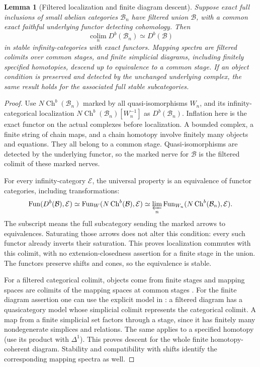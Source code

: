 \documentclass[11pt]{article}
\newtheorem{lemma}[theorem]{Lemma}
\theoremstyle{definition}
\theoremstyle{remark}
\begin{document}
\begin{lemma}[Filtered localization and finite diagram descent]
\label{lem:frag-filtered-enhanced-localization}
Suppose exact full inclusions of small abelian categories
$\mathcal B_n$ have filtered union $\mathcal B$, with a common exact
faithful underlying functor detecting cohomology.  Then
\[
 \operatorname*{colim}_nD^b(\mathcal B_n)\simeq D^b(\mathcal B)
\]
in stable infinity-categories with exact functors.  Mapping spectra
are filtered colimits over common stages, and finite simplicial
diagrams, including finitely specified homotopies, descend up to
equivalence to a common stage.  If an object condition is preserved
and detected by the unchanged underlying complex, the same result
holds for the associated full stable subcategories.
\end{lemma}
\begin{proof}
Use $N\operatorname{Ch}^b(\mathcal B_n)$ marked by all
quasi-isomorphisms $W_n$, and its infinity-categorical localization
$N\operatorname{Ch}^b(\mathcal B_n)[W_n^{-1}]$ as $D^b(\mathcal B_n)$.
Inflation here is the exact functor on the actual complexes before
localization.  A bounded complex, a finite string of chain maps,
and a chain homotopy involve finitely many objects and equations.
They all belong to a common stage.  Quasi-isomorphisms are detected
by the underlying functor, so the marked nerve for $\mathcal B$
is the filtered colimit of these marked nerves.

For every infinity-category $\mathcal E$, the universal property is
an equivalence of functor categories, including transformations:
\[
 \operatorname{Fun}(D^b(\mathcal B),\mathcal E)
 \simeq \operatorname{Fun}_{W}(N\operatorname{Ch}^b(\mathcal B),\mathcal E)
 \simeq \varprojlim_n
       \operatorname{Fun}_{W_n}(N\operatorname{Ch}^b(\mathcal B_n),\mathcal E).
\]
The subscript means the full subcategory sending the marked arrows
to equivalences.  Saturating those arrows does not alter this
condition: every such functor already inverts their saturation.
This proves localization commutes with this colimit, with no
extension-closedness assertion for a finite stage in the union.
The functors preserve shifts and cones, so the equivalence is stable.

For a filtered categorical colimit, objects come from finite stages
and mapping spaces are colimits of the mapping spaces at common
stages \cite[Lemma 0.2.1]{RozenblyumFilteredColimits}.  For the finite
diagram assertion one can use the explicit model in \cite[\S0.5]{RozenblyumFilteredColimits}:
a filtered diagram has a quasicategory model whose simplicial
colimit represents the categorical colimit.  A map from a finite
simplicial set factors through a stage, since it has finitely many
nondegenerate simplices and relations.  The same applies to a
specified homotopy (use its product with $\Delta^1$).  This proves descent for the whole finite homotopy-coherent diagram.  Stability and compatibility with shifts
identify the corresponding mapping spectra as well.


\end{proof}
\end{document}
